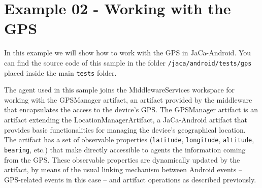 \documentclass[11pt]{report}
\newcommand\code[1]{{\mbox{\texttt{{#1}}}}}
\begin{document}
\section{Example 02 - Working with the GPS}

In this example we will show how to work with the GPS in \textsf{JaCa-Android}. You can find the source code of this sample in the folder \code{/jaca/android/tests/gps} placed inside the main \code{tests} folder. 

The agent used in this sample joins the \textsf{MiddlewareServices} workspace for working with the \textsf{GPSManager} artifact, an artifact provided by the middleware that encapsulates the access to the device's GPS.  The \textsf{GPSManager} artifact is an artifact extending the \textsf{LocationManagerArtifact}, a \textsf{JaCa-Android} artifact that provides basic functionalities for managing the device's geographical location.
%
The artifact has a set of observable properties (\code{latitude}, \code{longitude}, \code{altitude}, \code{bearing}, etc.) that make directly accessible to agents the information coming from the GPS. 
%
These observable properties are dynamically updated by the artifact, by means of the usual linking mechanism between Android events -- GPS-related events in this case -- and artifact operations as described previously. 
\end{document}
